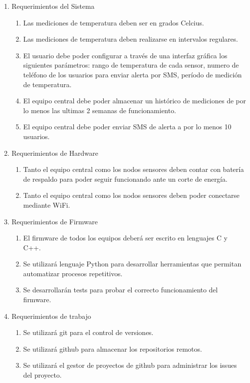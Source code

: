 \documentclass[11pt]{charter}
\begin{document}
\begin{enumerate}
\item Requerimientos del Sistema
	\begin{enumerate}
	\item Las mediciones de temperatura deben ser en grados Celcius.
	\item Las mediciones de temperatura deben realizarse en intervalos regulares.
	\item El usuario debe poder configurar a través de una interfaz gráfica los siguientes parámetros: rango de temperatura de cada sensor, numero de teléfono de los usuarios para enviar alerta por SMS, período de medición de temperatura.
    \item El equipo central debe poder almacenar un histórico de mediciones de por lo menos las ultimas 2 semanas de funcionamiento.
	\item El equipo central debe poder enviar SMS de alerta a por lo menos 10 usuarios.
	\end{enumerate}
\item Requerimientos de Hardware
	\begin{enumerate}
	\item Tanto el equipo central como los nodos sensores deben contar con batería de respaldo para poder seguir funcionando ante un corte de energía.
	\item Tanto el equipo central como los nodos sensores deben poder conectarse mediante WiFi.
	\end{enumerate}
\item Requerimientos de Firmware
	\begin{enumerate}
	\item El firmware de todos los equipos deberá ser escrito en lenguajes C y C++.
	\item Se utilizará lenguaje Python para desarrollar herramientas que permitan automatizar procesos repetitivos.
    \item Se desarrollarán tests para probar el correcto funcionamiento del firmware.
	\end{enumerate}
\item Requerimientos de trabajo
	\begin{enumerate}
	\item Se utilizará git para el control de versiones.
	\item Se utilizará github para almacenar los repositorios remotos.
    \item Se utilizará el gestor de proyectos de github para administrar los issues del proyecto.
	\end{enumerate}
\end{enumerate}
\end{document}
